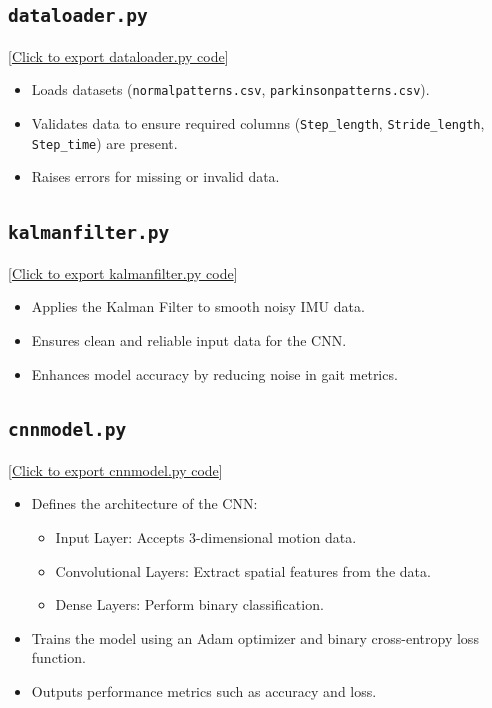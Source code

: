 \subsection{\texttt{dataloader.py}}
[\href{run:../Code/MicroPython/project code/src/dataloader.py}{Click to export dataloader.py code}] 
\begin{itemize}
    \item Loads datasets (\texttt{normalpatterns.csv}, \texttt{parkinsonpatterns.csv}).
    \item Validates data to ensure required columns (\texttt{Step\_length}, \texttt{Stride\_length}, \texttt{Step\_time}) are present.
    \item Raises errors for missing or invalid data.
\end{itemize}

\subsection{\texttt{kalmanfilter.py}}
[\href{run:../Code/MicroPython/project code/src/kalmanfilter.py}{Click to export kalmanfilter.py code}] 
\begin{itemize}
    \item Applies the Kalman Filter to smooth noisy IMU data.
    \item Ensures clean and reliable input data for the CNN.
    \item Enhances model accuracy by reducing noise in gait metrics.
\end{itemize}

\subsection{\texttt{cnnmodel.py}}
[\href{run:../Code/MicroPython/project code/src/cnnmodel.py}{Click to export cnnmodel.py code}] 
\begin{itemize}
    \item Defines the architecture of the CNN:
    \begin{itemize}
        \item Input Layer: Accepts 3-dimensional motion data.
        \item Convolutional Layers: Extract spatial features from the data.
        \item Dense Layers: Perform binary classification.
    \end{itemize}
    \item Trains the model using an Adam optimizer and binary cross-entropy loss function.
    \item Outputs performance metrics such as accuracy and loss.
\end{itemize}


